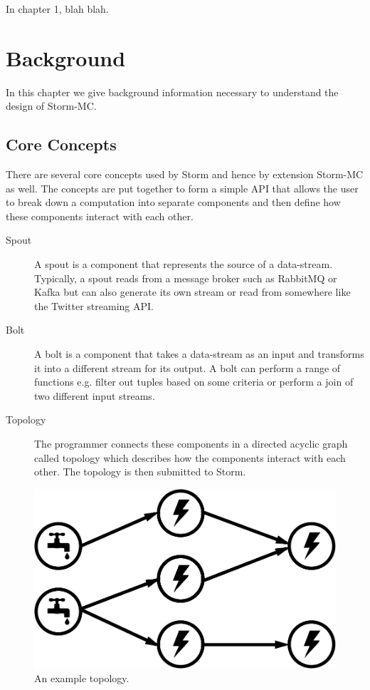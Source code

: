 \documentclass[bsc,logo,frontabs,twoside,singlespacing,normalheadings,parskip]{infthesis}     %
\begin{document}
In chapter 1, blah blah.




\chapter{Background}

In this chapter we give background information necessary to understand the design of Storm-MC.

\section{Core Concepts}

There are several core concepts used by Storm and hence by extension Storm-MC as well. The concepts are put together to form a simple API that allows the user to break down a computation into separate components and then define how these components interact with each other.

\begin{description}
  \item[Spout] A spout is a component that represents the source of a data-stream. Typically, a spout reads from a message broker such as RabbitMQ or Kafka but can also generate its own stream or read from somewhere like the Twitter streaming API.
  \item[Bolt] A bolt is a component that takes a data-stream as an input and transforms it into a different stream for its output. A bolt can perform a range of functions e.g. filter out tuples based on some criteria or perform a join of two different input streams.
  \item[Topology] The programmer connects these components in a directed acyclic graph called topology which describes how the components interact with each other. The topology is then submitted to Storm.
\end{description}

\begin{figure}[!htb]
	\centering
	\includegraphics[scale=0.3]{pdf/topology.pdf}
	\caption{An example topology.}
	\label{fig:topology}
\end{figure}
\end{document}
